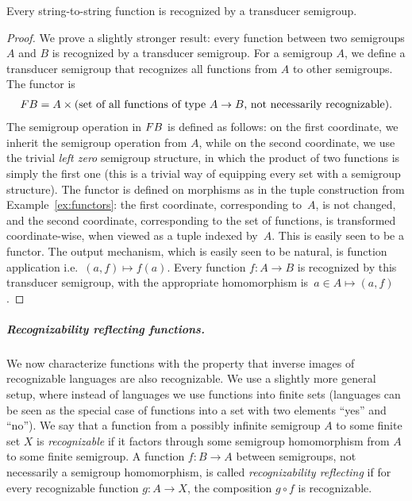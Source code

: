 \begin{theorem}\label{thm:all-functions} 
 Every string-to-string function is recognized by a transducer semigroup.
\end{theorem}
\begin{proof}
 We prove a slightly stronger result: every function between two semigroups $A$ and $B$ is recognized by a transducer semigroup.
 For a semigroup $A$, we define a transducer semigroup that recognizes all functions from $A$ to other semigroups. The functor is 
 \begin{align*}
 \functor B = A \times \text{(set of all functions of type $A \to B$, not necessarily recognizable)}.
 \end{align*}
 The semigroup operation in $\functor B$ is defined as follows: on the first coordinate, we inherit the semigroup operation from $A$, while on the second coordinate, we use the trivial \emph{left zero} semigroup structure, in which  the product of two functions is simply the first one (this is a trivial way of equipping every set with a semigroup structure). The functor is defined on morphisms
as in the tuple construction from Example~\ref{ex:functors}: the first coordinate, corresponding to~$A$, is not changed, and the second coordinate, corresponding to the set of functions, is transformed coordinate-wise, when viewed as a tuple indexed by~$A$. This is easily seen to be a functor. The output mechanism, which is easily seen to be natural, is function application i.e.~$(a,f) \mapsto f(a)$.
Every function $f\colon A \to B$ is recognized by this transducer semigroup, with the appropriate homomorphism is~$a \in A \mapsto (a,f)$.
\end{proof}

\subparagraph{Recognizability reflecting functions.} We now characterize functions with the property that inverse images of recognizable languages are also recognizable. We use a slightly more general setup, where instead of languages we use functions into finite sets (languages can be seen as the special case of functions into a set with two elements ``yes'' and ``no''). We say that a function from a possibly infinite semigroup $A$ to some finite set $X$ is \emph{recognizable} if it factors through some semigroup homomorphism from $A$ to some finite semigroup. 
 A function $f\colon B \to A$ between semigroups, not necessarily a semigroup homomorphism, is called \emph{recognizability reflecting} if for every recognizable function $g\colon A \to X$, the composition $g \circ f$ is recognizable. 


